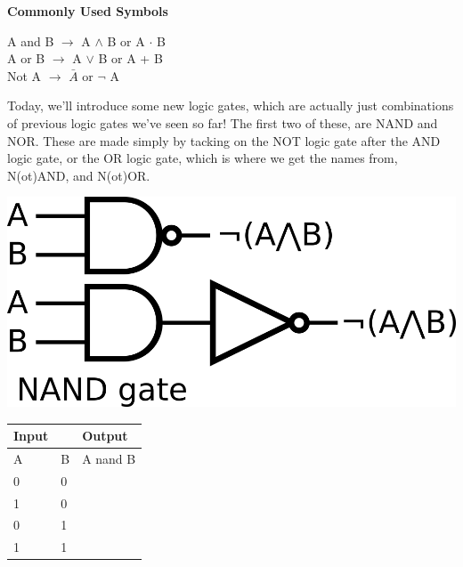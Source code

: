 \vspace{10mm}
\begin{center}
	\Large
	\textbf{Commonly Used Symbols}
	\normalsize
	
	A and B $\rightarrow$ A $\wedge$ B or A $\cdot$ B\\
	A or B $\rightarrow$ A $\vee $ B or A + B\\
	Not A $\rightarrow$ $\bar{A}$ or $\neg$ A\\
\end{center}

\newpage
Today, we'll introduce some new logic gates, which are actually just combinations of previous logic gates we've seen so far! The first
two of these, are NAND and NOR. These are made simply by tacking on the NOT logic gate after the AND logic gate, or the OR logic gate,
which is where we get the names from, N(ot)AND, and N(ot)OR.\\
\vspace{20mm}
\hspace{1in}
\begin{minipage}{.5\linewidth}
    \includegraphics[width=3 in]{images/nand_diagram.png}
	\label{img2}
\end{minipage}
\begin{minipage}{\linewidth}
    \begin{tabular}{|ll|l|}
        \hline
        Input                   &   & Output  \\ \hline
        \multicolumn{1}{|l|}{A} & B & A nand B \\ \hline
        \multicolumn{1}{|l|}{0} & 0 &        \\ \hline
        \multicolumn{1}{|l|}{1} & 0 &        \\ \hline
        \multicolumn{1}{|l|}{0} & 1 &        \\ \hline
        \multicolumn{1}{|l|}{1} & 1 &        \\ \hline
    \end{tabular}
\end{minipage}\\
\vspace{20mm}
\hspace{1in}
